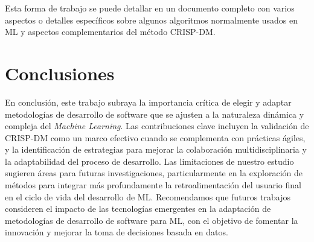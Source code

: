 \documentclass[journal]{IEEEtran}
\begin{document}
Esta forma de trabajo se puede detallar en un documento completo con varios aspectos o detalles específicos sobre algunos algoritmos normalmente usados en ML y aspectos complementarios del método CRISP-DM.\\

\section{Conclusiones}
En conclusión, este trabajo subraya la importancia crítica de elegir y adaptar metodologías de desarrollo de software que se ajusten a la naturaleza dinámica y compleja del \textit{Machine Learning}. Las contribuciones clave incluyen la validación de CRISP-DM como un marco efectivo cuando se complementa con prácticas ágiles, y la identificación de estrategias para mejorar la colaboración multidisciplinaria y la adaptabilidad del proceso de desarrollo. Las limitaciones de nuestro estudio sugieren áreas para futuras investigaciones, particularmente en la exploración de métodos para integrar más profundamente la retroalimentación del usuario final en el ciclo de vida del desarrollo de ML. Recomendamos que futuros trabajos consideren el impacto de las tecnologías emergentes en la adaptación de metodologías de desarrollo de software para ML, con el objetivo de fomentar la innovación y mejorar la toma de decisiones basada en datos.




\end{document}
